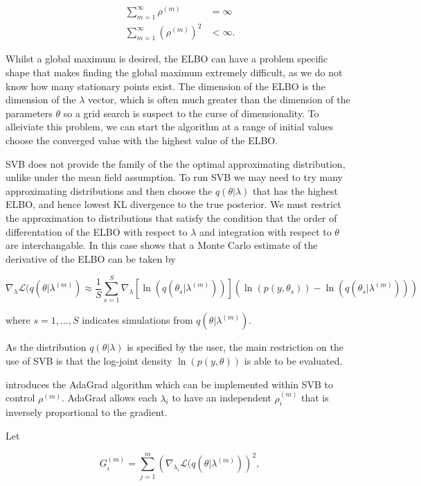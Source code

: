 \documentclass{article}\usepackage[]{graphicx}\usepackage[]{color}
\begin{document}
\begin{align}
\sum_{m=1}^{\infty} \rho^{(m)} &=  \infty \\
\sum_{m=1}^{\infty} (\rho^{(m)})^2 &<  \infty.
\end{align}

Whilst a global maximum is desired, the ELBO can have a problem specific shape that makes finding the global maximum extremely difficult, as we do not know how many stationary points exist. The dimension of the ELBO is the dimension of the $\lambda$ vector, which is often much greater than the dimension of the parameters $\theta$ so a grid search is suspect to the curse of dimensionality. To alleiviate this problem, we can start the algorithm at a range of initial values choose the converged value with the highest value of the ELBO. 

SVB does not provide the family of the the optimal approximating distribution, unlike under the mean field assumption. To run SVB we may need to try many approximating distributions and then choose the $q(\theta | \lambda)$ that has the highest ELBO, and hence lowest KL divergence to the true posterior. We must restrict the approximation to distributions that satisfy the condition that the order of differentation of the ELBO with respect to $\lambda$ and integration with respect to $\theta$ are interchangable. In this case \citet{Ranganath2014} shows that a Monte Carlo estimate of the derivative of the ELBO can be taken by

\begin{equation}
\label{SGA2}
\nabla_{\lambda}\mathcal{L}(q(\theta | \lambda^{(m)}) \approx \frac{1}{S}\sum_{s=1}^{S} \nabla_{\lambda} [\ln(q(\theta_s | \lambda^{(m)}))] (\ln (p(y, \theta_s)) - \ln(q(\theta_s | \lambda^{(m)})))
\end{equation}

where $s = 1, \dots, S$ indicates simulations from $q(\theta | \lambda^{(m)})$.

As the distribution $q(\theta | \lambda)$ is specified by the user, the main restriction on the use of SVB is that the log-joint density $\ln(p(y, \theta))$ is able to be evaluated.

\citet{Duchi2011} introduces the AdaGrad algorithm which can be implemented within SVB to control $\rho^{(m)}$. AdaGrad allows each $\lambda_i$ to have an independent $\rho^{(m)}_i$ that is inversely proportional to the gradient. 

Let 

\begin{equation}
\label{SGA3}
G_i^{(m)} = \sum_{j = 1}^{m} \left(\nabla_{\lambda_i}\mathcal{L}(q(\theta | \lambda^{(m)})\right)^2,
\end{equation}
\end{document}
